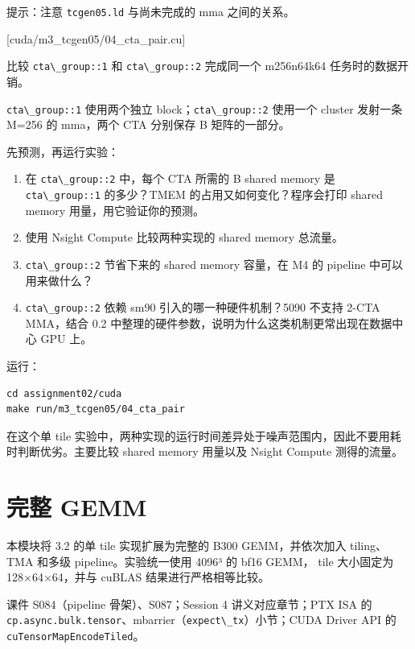 \documentclass[11pt,a4paper,fontset=none]{ctexart}
\providecommand{\passthrough}[1]{#1}
\begin{document}
提示：注意 \passthrough{\lstinline!tcgen05.ld!} 与尚未完成的 mma
之间的关系。

[cuda/m3\_tcgen05/04\_cta\_pair.cu]

比较 \passthrough{\lstinline!cta\_group::1!} 和
\passthrough{\lstinline!cta\_group::2!} 完成同一个 m256n64k64
任务时的数据开销。

\passthrough{\lstinline!cta\_group::1!} 使用两个独立
block；\passthrough{\lstinline!cta\_group::2!} 使用一个 cluster 发射一条
M=256 的 mma，两个 CTA 分别保存 B 矩阵的一部分。

先预测，再运行实验：

\begin{enumerate}
\def\labelenumi{(\alph{enumi})}
\item
  在 \passthrough{\lstinline!cta\_group::2!} 中，每个 CTA 所需的 B
  shared memory 是 \passthrough{\lstinline!cta\_group::1!} 的多少？TMEM
  的占用又如何变化？程序会打印 shared memory 用量，用它验证你的预测。
\item
  使用 Nsight Compute 比较两种实现的 shared memory 总流量。
\item
  \passthrough{\lstinline!cta\_group::2!} 节省下来的 shared memory
  容量，在 M4 的 pipeline 中可以用来做什么？
\item
  \passthrough{\lstinline!cta\_group::2!} 依赖 sm90
  引入的哪一种硬件机制？5090 不支持 2-CTA MMA，结合 0.2
  中整理的硬件参数，说明为什么这类机制更常出现在数据中心 GPU 上。
\end{enumerate}

运行：

\begin{lstlisting}
cd assignment02/cuda
make run/m3_tcgen05/04_cta_pair
\end{lstlisting}

在这个单 tile
实验中，两种实现的运行时间差异处于噪声范围内，因此不要用耗时判断优劣。主要比较
shared memory 用量以及 Nsight Compute 测得的流量。

\hypertarget{ux5b8cux6574-gemm}{%
\section{完整 GEMM}\label{ux5b8cux6574-gemm}}

本模块将 3.2 的单 tile 实现扩展为完整的 B300 GEMM，并依次加入
tiling、TMA 和多级 pipeline。实验统一使用 4096³ 的 bf16 GEMM， tile
大小固定为 128×64×64，并与 cuBLAS 结果进行严格相等比较。

\begin{reading}

课件 S084（pipeline 骨架）、S087；Session 4 讲义对应章节；PTX ISA 的
\passthrough{\lstinline!cp.async.bulk.tensor!}、mbarrier（\passthrough{\lstinline!expect\_tx!}）小节；CUDA
Driver API 的 \passthrough{\lstinline!cuTensorMapEncodeTiled!}。

\end{reading}
\end{document}
